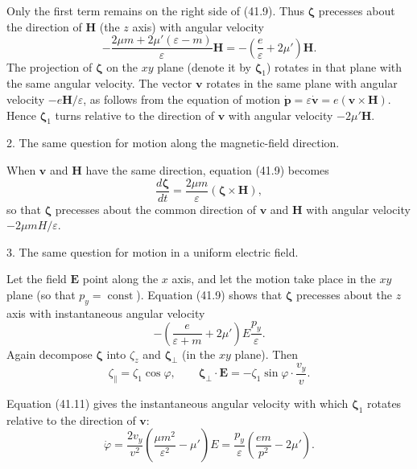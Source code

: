 \SolutionHeading Only the first term remains on the right side of (41.9). Thus $\boldsymbol\zeta$ precesses about the direction of $\mathbf H$ (the $z$ axis) with angular velocity
\[
-\frac{2\mu m+2\mu'(\varepsilon-m)}\varepsilon\mathbf H
=-\left(\frac e\varepsilon+2\mu'\right)\mathbf H.
\]
The projection of $\boldsymbol\zeta$ on the $xy$ plane (denote it by $\boldsymbol\zeta_1$) rotates in that plane with the same angular velocity. The vector $\mathbf v$ rotates in the same plane with angular velocity $-e\mathbf H/\varepsilon$, as follows from the equation of motion $\dot{\mathbf p}=\varepsilon\dot{\mathbf v}=e(\mathbf v\times\mathbf H)$. Hence $\boldsymbol\zeta_1$ turns relative to the direction of $\mathbf v$ with angular velocity $-2\mu'\mathbf H$.

2. The same question for motion along the magnetic-field direction.

\SolutionHeading When $\mathbf v$ and $\mathbf H$ have the same direction, equation (41.9) becomes
\[
\frac{d\boldsymbol\zeta}{dt}=\frac{2\mu m}\varepsilon(\boldsymbol\zeta\times\mathbf H),
\]
so that $\boldsymbol\zeta$ precesses about the common direction of $\mathbf v$ and $\mathbf H$ with angular velocity $-2\mu mH/\varepsilon$.

3. The same question for motion in a uniform electric field.

\SolutionHeading Let the field $\mathbf E$ point along the $x$ axis, and let the motion take place in the $xy$ plane (so that $p_y=\operatorname{const}$). Equation (41.9) shows that $\boldsymbol\zeta$ precesses about the $z$ axis with instantaneous angular velocity
\[
-\left(\frac e{\varepsilon+m}+2\mu'\right)E\frac{p_y}{\varepsilon}.
\]
Again decompose $\boldsymbol\zeta$ into $\zeta_z$ and $\boldsymbol\zeta_\perp$ (in the $xy$ plane). Then
\[
\zeta_\parallel=\zeta_1\cos\varphi,
\qquad
\boldsymbol\zeta_\perp\cdot\mathbf E=-\zeta_1\sin\varphi\cdot\frac{v_y}{v}.
\]

Equation (41.11) gives the instantaneous angular velocity with which $\boldsymbol\zeta_1$ rotates relative to the direction of $\mathbf v$:
\[
\dot\varphi=\frac{2v_y}{v^2}\left(\frac{\mu m^2}{\varepsilon^2}-\mu'\right)E
=\frac{p_y}{\varepsilon}\left(\frac{em}{p^2}-2\mu'\right).
\]
